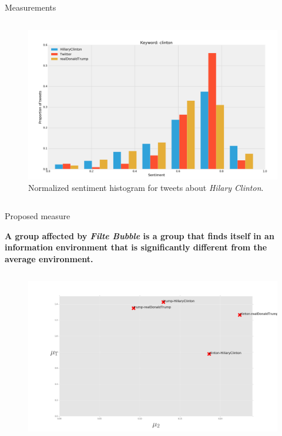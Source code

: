 \documentclass{beamer}
\begin{document}
\begin{frame}[fragile]
\begin{columns}[T]
\begin{column}{.63\textwidth}
\begin{block}{Measurements}
\begin{columns}
\begin{figure}
                \includegraphics[scale=0.5]{./Pics/hist-clinton.png}
                \caption*{Normalized sentiment histogram for tweets about \textit{Hilary Clinton}.}
            \end{figure}
    \end{columns}
\end{block}
\vspace{-2cm}
\begin{block}{Proposed measure}
    \centering
    \begin{large}\textbf{A group affected by \textit{Filte Bubble} is a group that finds itself in an information environment that is significantly different from the average environment.}\end{large}
    \begin{columns}
            \begin{figure}
                \centering
                \captionsetup{justification=centering,margin=1cm}
                \includegraphics[scale=0.55]{./Pics/metric-L2-1Q.png}

\end{figure}
\end{columns}
\end{block}
\end{column}
\end{columns}
\end{frame}
\end{document}

